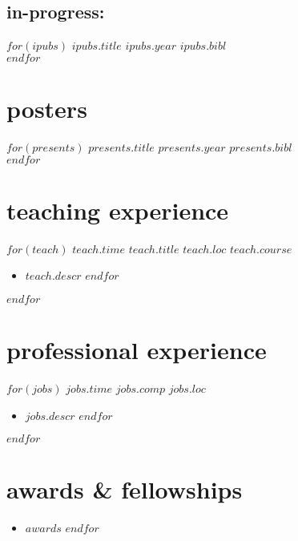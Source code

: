 \documentclass[]{friggeri-cv}
\begin{document}
\subsection{in-progress:}
\begin{entrylist}
$for(ipubs)$
  \entrypub
  {$ipubs.title$}
  {$ipubs.year$}
  {$ipubs.bibl$}\\
$endfor$
\end{entrylist}



\section{posters}
\begin{entrylist}
$for(presents)$
  \entrypub
  {$presents.title$}
  {$presents.year$}
  {$presents.bibl$}\\
$endfor$
\end{entrylist}



\section{teaching experience}
\begin{entrylist}
$for(teach)$
  \entry
  {$teach.time$}
  {$teach.title$}
  {$teach.loc$}
  {$teach.course$}
  \setlength\parskip{0pt}
  \begin{itemize}[noitemsep, leftmargin=0.2in]
    $for(teach.descr)$
      \item $teach.descr$
    $endfor$
  \end{itemize}
  \setlength\parskip{12pt}
$endfor$
\end{entrylist}

\section{professional experience}
\begin{entrylist}
$for(jobs)$
  \entryalt
  {$jobs.time$}
  {$jobs.comp$}
  {$jobs.loc$}
  \setlength\parskip{0pt}
  \begin{itemize}[noitemsep, leftmargin=0.2in]
    $for(jobs.descr)$
      \item $jobs.descr$
    $endfor$
  \end{itemize}
  \setlength\parskip{12pt}
$endfor$
\end{entrylist}



\section{awards \& fellowships}
\begin{itemize}[noitemsep, leftmargin=0.55in]
$for(awards)$
  \item $awards$
$endfor$
\end{itemize}
\end{document}

